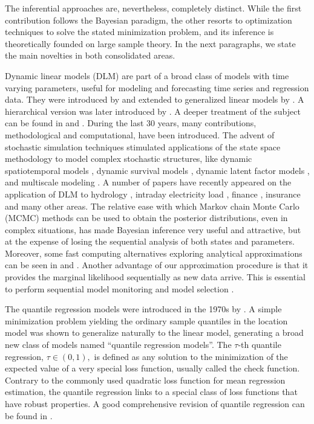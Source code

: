 \documentclass[12pt,a4paper]{article}\usepackage[]{graphicx}\usepackage[]{color}\usepackage{subfigure}
\begin{document}
The inferential approaches are, nevertheless, completely distinct. 
While the first contribution follows the Bayesian paradigm, the other resorts to optimization techniques to solve the stated minimization problem, and its inference is theoretically founded on large sample theory. 
In the next paragraphs, we state the main novelties in both consolidated areas.

  
 
Dynamic linear models (DLM) are part of a broad class of models with time varying parameters, useful for modeling and forecasting time series and regression data. 
They were introduced by \cite{harrison1976bayesian} and extended to generalized linear models by \cite{west1985dynamic}. 
A hierarchical version was later introduced by \cite{gamerman1993dynamic}. 
A  deeper treatment of the subject can be found in %
\cite{west1997,durbin2002simple, Migon2005, Petris2009dynamic} and \cite{prado2010time}. %
During the last 30 years, many contributions, methodological and  computational, have been introduced. 
The advent of stochastic simulation techniques stimulated applications of the state space methodology to model complex stochastic structures, like 
dynamic spatiotemporal models \cite{gamerman2003space}, 
dynamic survival models \cite{bastos2006dynamic},
dynamic latent factor models \cite{lopes2008spatial}, and
multiscale modeling \cite{ferreira2011dynamic, fonseca2017jasa}. 
A number of papers have recently appeared on the application of DLM  to  
hydrology \cite{fernandes2009modelling}, 
intraday electricity load \cite{migon2013multivariate}, 
finance \cite{zhao2016dynamic}, 
insurance and many other areas. 
The relative ease with which Markov chain Monte Carlo (MCMC) methods can be used to obtain the posterior distributions, even in complex situations, has made Bayesian inference very useful and attractive, but at the expense of losing the sequential analysis of both states and parameters.
Moreover, some fast computing alternatives exploring analytical approximations can be seen in  \cite{da2011dynamic} and \cite{souza2016extended}. 
Another advantage of our approximation procedure is that it provides the marginal likelihood sequentially as new data arrive. 
This is essential to perform sequential model monitoring and model selection \cite{West1981}.
 

The quantile regression models were introduced in the 1970s by \cite{Koenker1978}. 
A simple minimization problem yielding the ordinary sample quantiles in the location model was shown to generalize naturally to the linear model, generating a broad new class of models named  ``quantile regression models''.
The $\tau$-th quantile regression, $ \tau \in (0,1),$ is defined as any solution to the minimization of the expected value of a very special loss function, usually called the check function. 
Contrary to the commonly used quadratic loss function for mean regression estimation, the quantile regression links to a special class of loss functions that have robust properties.
A good comprehensive revision of quantile regression can be found in \cite{Koenker2005}. 
\end{document}
